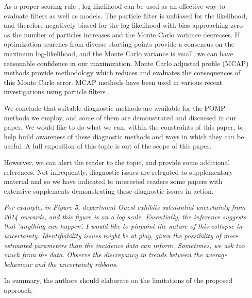 \documentclass[11pt]{article}
\newcommand\report[1]{{\color{mygreen} \vspace{1mm}\hspace{0.25in}\parbox{6in}{\em #1}}}
\begin{document}
As a proper scoring rule \cite{gneiting07}, log-likelihood can be used as an effective way to evaluate filters as well as models. 
The particle filter is unbiased for the likelihood, and therefore negatively biased for the log-likelihood with bias approaching zero as the number of particles increases and the Monte Carlo variance decreases.
If optimization searches from diverse starting points provide a consensus on the maximum log-likelihood, and the Monte Carlo variance is small, we can have reasonable confidence in our maximization.
Monte Carlo adjusted profile (MCAP) methods \cite{ionides17,ning21} provide methodology which reduces and evaluates the consequences of this Monte Carlo error.
MCAP methods have been used in various recent investigations using particle filters \cite{subramanian21,ali22,pons-salort18}.

We conclude that suitable diagnostic methods are available for the POMP methods we employ, and some of them are demonstrated and discussed in our paper.
We would like to do what we can, within the constraints of this paper, to help build awareness of these diagnostic methods and ways in which they can be useful.
A full exposition of this topic is out of the scope of this paper.


Howerver, we can alert the reader to the topic, and provide some additional references.
Not infrequently, diagnostic issues are relegated to supplementary material and so we have indicated to interested readers some papers with extensive supplements demonstrating these diagnostic issues in action.

\report{
For example, in Figure 5, department Ouest exhibits substantial uncertainty from 2014 onwards, and this figure is on a log scale. Essentially, the inference suggests that 'anything can happen'. I would like to pinpoint the nature of this collapse in uncertainty. Identifiability issues might be at play, given the possibility of more estimated parameters than the incidence data can inform. Sometimes, we ask too much from the data. Observe the discrepancy in trends between the average behaviour and the uncertainty ribbons.

In summary, the authors should elaborate on the limitations of the proposed approach.
}
\end{document}
